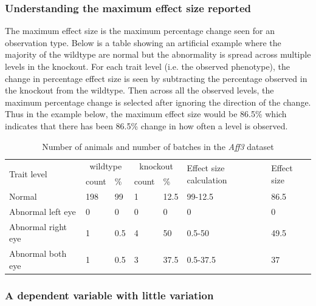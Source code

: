 \documentclass[12pt,a4paper]{article}
\begin{document}
\subsubsection{Understanding the maximum effect size reported}
\label{FE_EffectSize}
The maximum effect size is the maximum percentage change seen for an observation type. 
Below is a table showing an artificial example where the majority of the wildtype are normal but the abnormality is spread across multiple levels in the knockout. 
For each trait level (i.e. the observed phenotype), the change in percentage effect size is seen by subtracting the percentage observed in the knockout from the wildtype. 
Then across all the observed levels, the maximum percentage change is selected after ignoring the direction of the change. 
Thus in the example below, the maximum effect size would be 86.5\% which indicates that there has been 86.5\% change in how often a level is observed.

\begin{table}[!h]
\begin{center}
\begin{tabular}{| l | l | l | l | l | l | l| }
  \hline
\multirow{2}{*}{Trait level}&\multicolumn{2}{c}{wildtype}&\multicolumn{2}{c}{knockout}&\multirow{2}{*}{Effect size calculation}&\multirow{2}{*}{Effect size}\\
		     &count& \%			    &count& \%                   &                                        &\\\hline 
Normal &198& 99			    &1& 12.5                   &          99-12.5                              &86.5\\ 
Abnormal left eye&0& 0			    &0& 0                   &          0                              &0\\ 
Abnormal right eye&1& 0.5			    &4& 50                   &          0.5-50                             &49.5\\ 
Abnormal both eye&1& 0.5			    &3& 37.5                   &          0.5-37.5                             &37\\ 
\hline  
\end{tabular}
\caption{Number of animals and number of batches in the \textit{Aff3} dataset}\label{table:10}
\end{center}
\end{table}

\subsubsection{A dependent variable with little variation}
\end{document}
